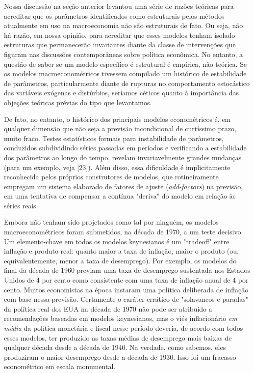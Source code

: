 \documentclass[12pt]{article}
\begin{document}
Nossa discussão na seção anterior levantou uma série de razões teóricas para acreditar que os parâmetros identificados como estruturais pelos métodos atualmente em uso na macroeconomia não são estruturais de fato. Ou seja, não há razão, em nossa opinião, para acreditar que esses modelos tenham isolado estruturas que permanecerão invariantes diante da classe de intervenções que figuram nas discussões contemporâneas sobre política econômica. No entanto, a questão de saber se um modelo específico é estrutural é empírica, não teórica. Se os modelos macroeconométricos tivessem compilado um histórico de estabilidade de parâmetros, particularmente diante de rupturas no comportamento estocástico das variáveis exógenas e distúrbios, seríamos céticos quanto à importância das objeções teóricas prévias do tipo que levantamos.

De fato, no entanto, o histórico dos principais modelos econométricos é, em qualquer dimensão que não seja a previsão incondicional de curtíssimo prazo, muito fraco. Testes estatísticos formais para instabilidade de parâmetros, conduzidos subdividindo séries passadas em períodos e verificando a estabilidade dos parâmetros ao longo do tempo, revelam invariavelmente grandes mudanças (para um exemplo, veja [23]). Além disso, essa dificuldade é implicitamente reconhecida pelos próprios construtores de modelos, que rotineiramente empregam um sistema elaborado de fatores de ajuste (\textit{add-factors}) na previsão, em uma tentativa de compensar a contínua "deriva" do modelo em relação às séries reais.

Embora não tenham sido projetados como tal por ninguém, os modelos macroeconométricos foram submetidos, na década de 1970, a um teste decisivo. Um elemento-chave em todos os modelos keynesianos é um "tradeoff" entre inflação e produto real: quanto maior a taxa de inflação, maior o produto (ou, equivalentemente, menor a taxa de desemprego). Por exemplo, os modelos do final da década de 1960 previam uma taxa de desemprego sustentada nos Estados Unidos de 4 por cento como consistente com uma taxa de inflação anual de 4 por cento. Muitos economistas na época instaram uma política deliberada de inflação com base nessa previsão. Certamente o caráter errático de "solavancos e paradas" da política real dos EUA na década de 1970 não pode ser atribuído a recomendações baseadas em modelos keynesianos, mas o viés inflacionário \textit{em média} da política monetária e fiscal nesse período deveria, de acordo com todos esses modelos, ter produzido as taxas médias de desemprego mais baixas de qualquer década desde a década de 1940. Na verdade, como sabemos, eles produziram o maior desemprego desde a década de 1930. Isso foi um fracasso econométrico em escala monumental.
\end{document}
